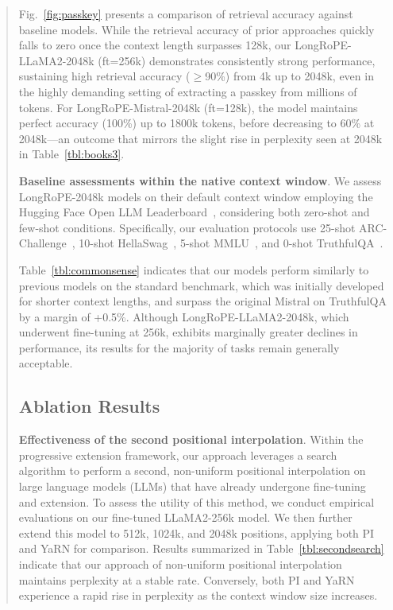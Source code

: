 \begin{abstract}
Fig.~\ref{fig:passkey} presents a comparison of retrieval accuracy against baseline models. While the retrieval accuracy of prior approaches quickly falls to zero once the context length surpasses 128k, our LongRoPE-LLaMA2-2048k (ft=256k) demonstrates consistently strong performance, sustaining high retrieval accuracy ($\ge$90\%) from 4k up to 2048k, even in the highly demanding setting of extracting a passkey from millions of tokens. For LongRoPE-Mistral-2048k (ft=128k), the model maintains perfect accuracy (100\%) up to 1800k tokens, before decreasing to 60\% at 2048k—an outcome that mirrors the slight rise in perplexity seen at 2048k in Table~\ref{tbl:books3}.

\textbf{Baseline assessments within the native context window}. We assess LongRoPE-2048k models on their default context window employing the Hugging Face Open LLM Leaderboard~\cite{huggingfaceboard}, considering both zero-shot and few-shot conditions. Specifically, our evaluation protocols use 25-shot ARC-Challenge~\cite{allenai:arc}, 10-shot HellaSwag~\cite{zellers2019hellaswag}, 5-shot MMLU~\cite{mmlu}, and 0-shot TruthfulQA~\cite{lin2021truthfulqa}.

Table~\ref{tbl:commonsense} indicates that our models perform similarly to previous models on the standard benchmark, which was initially developed for shorter context lengths, and surpass the original Mistral on TruthfulQA by a margin of +0.5\%. Although LongRoPE-LLaMA2-2048k, which underwent fine-tuning at 256k, exhibits marginally greater declines in performance, its results for the majority of tasks remain generally acceptable.

\subsection{Ablation Results}

\textbf{Effectiveness of the second positional interpolation}. Within the progressive extension framework, our approach leverages a search algorithm to perform a second, non-uniform positional interpolation on large language models (LLMs) that have already undergone fine-tuning and extension. To assess the utility of this method, we conduct empirical evaluations on our fine-tuned LLaMA2-256k model. We then further extend this model to 512k, 1024k, and 2048k positions, applying both PI and YaRN for comparison. Results summarized in Table~\ref{tbl:secondsearch} indicate that our approach of non-uniform positional interpolation maintains perplexity at a stable rate. Conversely, both PI and YaRN experience a rapid rise in perplexity as the context window size increases.


\end{abstract}
